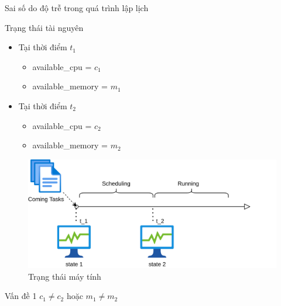 \documentclass[11pt,xcolor={dvipsnames}, aspectratio=169]{beamer}
\begin{document}
\begin{frame}
{Sai số do độ trễ trong quá trình lập lịch}
	\begin{minipage}[t]{0.4\linewidth}
		\begin{block}{Trạng thái tài nguyên}
		\begin{itemize}
			\item <2-> Tại thời điểm $t_{1}$
			\begin{itemize}
				\item available\_cpu = $c_{1}$
				\item available\_memory = $m_{1}$
			\end{itemize}
			\item <2-> Tại thời điểm $t_{2}$
			\begin{itemize}
				\item available\_cpu = $c_{2}$
				\item available\_memory = $m_{2}$
			\end{itemize}
		\end{itemize}
		\end{block}
	\end{minipage}
	\hfill
	\begin{minipage}[t]{0.59\linewidth}
		\begin{figure}
			\centering
			\includegraphics[scale=0.5]{images/state_change.png}
			\caption{Trạng thái máy tính}
		\end{figure}
	\end{minipage}
	\pause
	\pause
	\begin{center}
		\begin{block}
		{\centering Vấn đề 1}
				\centering $c_{1} \neq c_{2}$ hoặc $m_{1} \neq m_{2}$
		\end{block}
	\end{center}
\end{frame}
\end{document}
